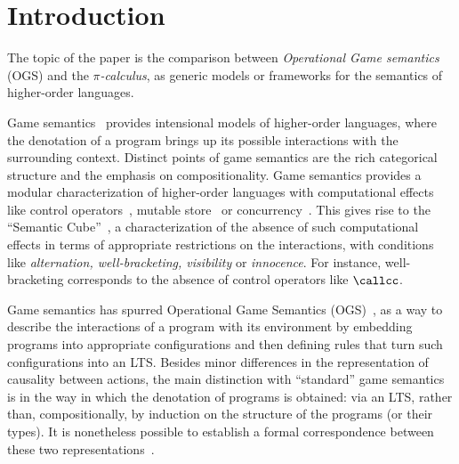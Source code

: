 \section{Introduction}
\label{s:intro}
             

The topic of the paper is the comparison between 
\emph{Operational Game semantics} (OGS) and the \emph{$\pi$-calculus}, as generic
models or frameworks for the semantics of higher-order languages.  

Game semantics~\cite{10.1006/inco.2000.2917,10.1006/inco.2000.2930} provides
intensional models of higher-order languages,
where the denotation of a program brings up its possible  interactions with the
surrounding context.
Distinct points of game semantics are the 
rich categorical structure and the emphasis on compositionality.
Game semantics provides a modular characterization of higher-order languages with
 computational effects like control operators~\cite{10.5555/788019.788859}, 
 mutable store~\cite{abramsky1997linearity,10.5555/788020.788891} 
 or concurrency~\cite{ghica2004angelic,10.1007/11944836_38}.
 This gives rise to the ``Semantic Cube''~\cite{10.5555/645726.667210},
 a characterization of the absence of such computational effects
 in terms of appropriate restrictions on the interactions, with conditions
 like \emph{alternation, well-bracketing, visibility} or \emph{innocence}.
For instance, well-bracketing corresponds to the absence of control operators
like $\callcc$.

Game semantics has spurred Operational Game Semantics
(OGS)~\cite{jagadeesan2009open,jeffrey2005java,laird2007,10.1016/j.entcs.2012.08.013,10.1145/2603088.2603150},
as a way to describe the interactions of a program with its 
environment by embedding  programs into appropriate configurations and then defining rules
that turn such configurations into an LTS.
Besides minor differences in the representation of causality between actions,
the main distinction with ``standard'' game semantics
is in the way in which the denotation of programs is obtained:
via an LTS, rather than, 
compositionally, by induction on the structure of the programs (or their types).
It is nonetheless possible to establish a formal correspondence between these two 
representations~\cite{10.1145/2603088.2603150}.

